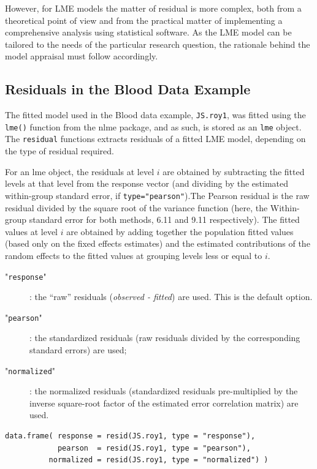 \documentclass[Main.tex]{subfiles}
\begin{document}
However, for LME models the matter of residual is more complex, both from a theoretical point of view and from the practical matter of implementing a comprehensive analysis using statistical software. As the LME model can be tailored to the needs of the particular research question, the rationale behind the model appraisal must follow accordingly.


\subsection{Residuals in the Blood Data Example}
The fitted model used in the Blood data example, \texttt{JS.roy1}, was fitted using the \texttt{lme()} function from the nlme package, and as such, is stored as an \texttt{lme} object. The \texttt{residual} functions extracts residuals of a fitted LME model, depending on the type of residual required.

For an lme object, the residuals at level $i$ are obtained by subtracting the fitted levels at that level from the response vector (and dividing by the estimated within-group standard error, if \texttt{type="pearson"}).The Pearson residual is the raw residual divided by the square root of the variance function (here, the Within-group standard error for both methods, 6.11 and 9.11 respectively). The fitted values at level $i$ are obtained by adding together the population fitted values (based only on the fixed effects estimates) and the estimated contributions of the random effects to the fitted values at grouping levels less or equal to $i$.

\begin{description}
	\item["\texttt{response}"]: the “raw” residuals (\textit{observed - fitted}) are used. This is the default option.
	\item["\texttt{pearson}"]: the standardized residuals (raw residuals divided by the corresponding standard errors) are used; 
	\item["\texttt{normalized}"]: the normalized residuals (standardized residuals pre-multiplied by the inverse square-root factor of the estimated error correlation matrix) are used.
\end{description}

\begin{framed}
\begin{verbatim}
data.frame( response = resid(JS.roy1, type = "response"), 
            pearson  = resid(JS.roy1, type = "pearson"), 
          normalized = resid(JS.roy1, type = "normalized") )
\end{verbatim}
\end{framed}
\end{document}
